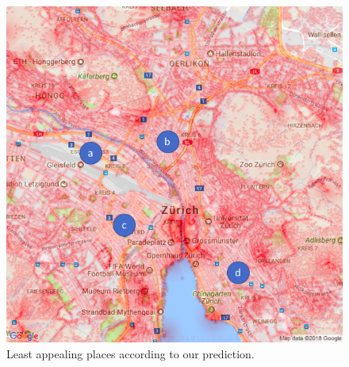 \documentclass[letterpaper]{article}
\begin{document}
\begin{figure}[H]
    \centering
     \includegraphics[width=.9\linewidth]{images/bad/combined_labeled.png}
    \caption{Least appealing places according to our prediction.}
    \label{fig:BadPlacesLegend}
\end{figure}
\end{document}
